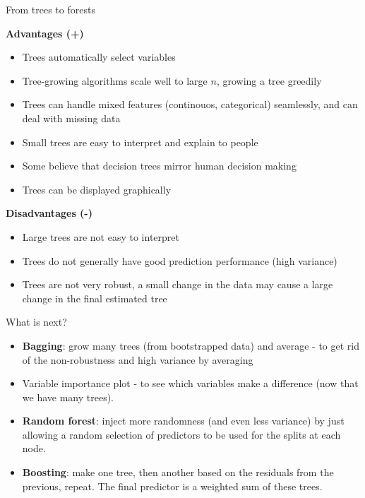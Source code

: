 \documentclass[ignorenonframetext,]{beamer}
\providecommand{\tightlist}{%
  \setlength{\itemsep}{0pt}\setlength{\parskip}{0pt}}
\begin{document}
\begin{frame}{From trees to forests}

\textbf{Advantages (+)}

\begin{itemize}
\tightlist
\item
  Trees automatically select variables
\item
  Tree-growing algorithms scale well to large \(n\), growing a tree
  greedily
\item
  Trees can handle mixed features (continouos, categorical) seamlessly,
  and can deal with missing data
\item
  Small trees are easy to interpret and explain to people
\item
  Some believe that decision trees mirror human decision making
\item
  Trees can be displayed graphically
\end{itemize}

\textbf{Disadvantages (-)}

\begin{itemize}
\tightlist
\item
  Large trees are not easy to interpret
\item
  Trees do not generally have good prediction performance (high
  variance)
\item
  Trees are not very robust, a small change in the data may cause a
  large change in the final estimated tree
\end{itemize}

\end{frame}

\begin{frame}

\begin{block}{What is next?}

\begin{itemize}
\tightlist
\item
  \textbf{Bagging}: grow many trees (from bootstrapped data) and average
  - to get rid of the non-robustness and high variance by averaging
\item
  Variable importance plot - to see which variables make a difference
  (now that we have many trees).
\item
  \textbf{Random forest}: inject more randomness (and even less
  variance) by just allowing a random selection of predictors to be used
  for the splits at each node.
\item
  \textbf{Boosting}: make one tree, then another based on the residuals
  from the previous, repeat. The final predictor is a weighted sum of
  these trees.
\end{itemize}

\end{block}

\end{frame}
\end{document}
